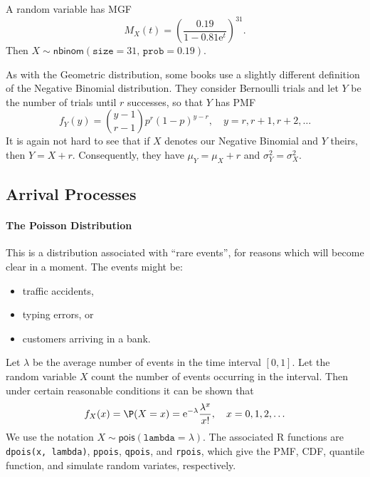 \documentclass[captions=tableheading]{scrbook}
\begin{document}
\begin{example}
A random variable has MGF
\[
M_{X}(t)=\left(\frac{0.19}{1-0.81\mathrm{e}^{t}}\right)^{31}.
\]
Then \(X\sim\mathsf{nbinom}(\mathtt{size}=31,\,\mathtt{prob}=0.19)\).
\end{example}

\begin{note}
As with the Geometric distribution, some books use a slightly different definition of the Negative Binomial distribution. They consider Bernoulli trials and let \(Y\) be the number of trials until \(r\) successes, so that \(Y\) has PMF
\begin{equation}
f_{Y}(y)={y-1 \choose r-1}p^{r}(1-p)^{y-r},\quad y=r,r+1,r+2,\ldots
\end{equation}
It is again not hard to see that if \(X\) denotes our Negative Binomial and \(Y\) theirs, then \(Y=X+r\). Consequently, they have \(\mu_{Y}=\mu_{X}+r\) and \(\sigma_{Y}^{2}=\sigma_{X}^{2}\).
\end{note}
\subsection{Arrival Processes}
\label{sec-5-6-3}

\label{sec:Arrival-Processes}

\paragraph*{The Poisson Distribution}
\label{sub:The-Poisson-Distribution}

This is a distribution associated with ``rare events'', for reasons which will become clear in a moment. The events might be:
\begin{itemize}
\item traffic accidents,
\item typing errors, or
\item customers arriving in a bank.
\end{itemize}


Let \(\lambda\) be the average number of events in the time interval \([0,1]\). Let the random variable \(X\) count the number of events occurring in the interval. Then under certain reasonable conditions it can be shown that
\begin{equation}
f_{X}(x)=\P(X=x)=\mathrm{e}^{-\lambda}\frac{\lambda^{x}}{x!},\quad x=0,1,2,\ldots
\end{equation}
We use the notation \(X\sim\mathsf{pois}(\mathtt{lambda}=\lambda)\). The associated \textsf{R} functions are \texttt{dpois(x, lambda)}, \texttt{ppois}, \texttt{qpois}, and \texttt{rpois}, which give the PMF, CDF, quantile function, and simulate random variates, respectively.
\end{document}
